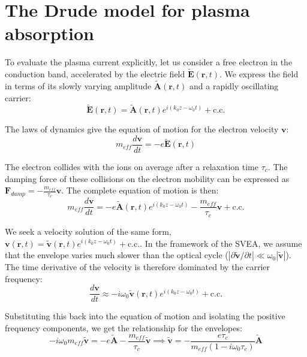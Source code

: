 \documentclass[11pt,a4paper]{article}
\begin{document}
\vspace{1em}
\vspace{1em}
\section{The Drude model for plasma absorption}
\newline
To evaluate the plasma current explicitly, let us consider a free electron in the conduction band, accelerated by the electric field $\tilde{\mathbf{E}}(\mathbf{r},t)$. We express the field in terms of its slowly varying amplitude $\tilde{\mathbf{A}}(\mathbf{r},t)$ and a rapidly oscillating carrier:
\begin{equation*}
\tilde{\mathbf{E}}(\mathbf{r},t) = \tilde{\mathbf{A}}(\mathbf{r},t) e^{i(k_0z-\omega_0t)} + \text{c.c.}
\end{equation*}

The laws of dynamics give the equation of motion for the electron velocity $\mathbf{v}$:
\begin{equation*}
m_{eff} \frac{d\mathbf{v}}{dt} = -e\tilde{\mathbf{E}}(\mathbf{r},t)
\end{equation*}

The electron collides with the ions on average after a relaxation time $\tau_c$. The damping force of these collisions on the electron mobility can be expressed as $\mathbf{F}_{damp}=-\frac{m_{eff}}{\tau_c}\mathbf{v}$. The complete equation of motion is then:
\begin{equation*}
m_{eff} \frac{d\mathbf{v}}{dt} = -e\tilde{\mathbf{A}}(\mathbf{r},t) e^{i(k_0z-\omega_0t)} - \frac{m_{eff}}{\tau_c}\mathbf{v} + \text{c.c.}
\end{equation*}

We seek a velocity solution of the same form, $\mathbf{v}(\mathbf{r},t) = \tilde{\mathbf{v}}(\mathbf{r},t) e^{i(k_0z-\omega_0t)} + \text{c.c.}$. 
In the framework of the SVEA, we assume that the envelope varies much slower than the optical cycle ($\left| \partial \tilde{\mathbf{v}} / \partial t \right| \ll \omega_0 |\tilde{\mathbf{v}}|$). The time derivative of the velocity is therefore dominated by the carrier frequency:
\begin{equation*}
\frac{d\mathbf{v}}{dt} \approx -i\omega_0 \tilde{\mathbf{v}}(\mathbf{r},t) e^{i(k_0z-\omega_0t)} + \text{c.c.}
\end{equation*}

Substituting this back into the equation of motion and isolating the positive frequency components, we get the relationship for the envelopes:
\begin{equation*}
-i\omega_0 m_{eff} \tilde{\mathbf{v}} = -e \tilde{\mathbf{A}} - \frac{m_{eff}}{\tau_c}\tilde{\mathbf{v}} \implies \tilde{\mathbf{v}} =  -\frac{e\tau_c}{m_{eff}(1-i\omega_0\tau_c)}\tilde{\mathbf{A}}
\end{equation*}
\end{document}
